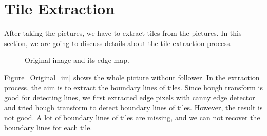 \section{Tile Extraction}
\label{sec:extract}
After taking the pictures, we have to extract tiles from the pictures.
In this section, we are going to discuss details about the tile 
extraction process.

\begin{figure}[htbp]
 \centering
{}
\caption{Original image and its edge map.}
\end{figure}

Figure~\ref{Original_im} shows the whole picture without follower. In the
extraction process, the aim is to extract the boundary lines of tiles. Since
hough transform is good for detecting lines, we first extracted edge pixels with
canny edge detector and tried hough transform to detect boundary lines of tiles.
However, the result is not good. A lot of boundary lines of tiles are missing,
and we can not recover the boundary lines for each tile.

